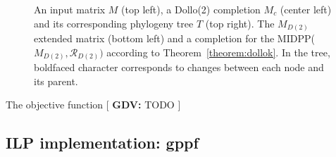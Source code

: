 \documentclass[a4paper,USenglish]{article}
\newcommand{\notaestesa}[2]{%
   \marginpar{\color{red!75!black}\textbf{\texttimes}}%
   {\color{red!75!black}%
     [\,\textbullet\,\textsf{\textbf{#1:}} %
     \textsf{\footnotesize#2}\,\textbullet\,]}%
 }
\theoremstyle{definition}
\begin{document}
\begin{figure}[tb!]
  \begin{minipage}{.5\linewidth}
  \end{minipage}
 \begin{minipage}{.5\linewidth}
      \end{minipage}


\caption{An input matrix $M$ (top left), a Dollo(2) completion $M_c$ (center
  left) and its corresponding phylogeny tree $T$ (top right). 
  The $M_{D(2)}$ extended matrix (bottom left) 
  and a completion for the MIDPP($M_{D(2)},\mathcal R_{D(2)})$
  according to Theorem~\ref{theorem:dollok}.
%
In the tree, boldfaced character corresponds to changes between each node and its parent.
}  
    \label{fig:M_e}
  \end{figure}

The objective function \notaestesa{GDV}{ TODO}

\subsection{ILP implementation: gppf}
\end{document}

